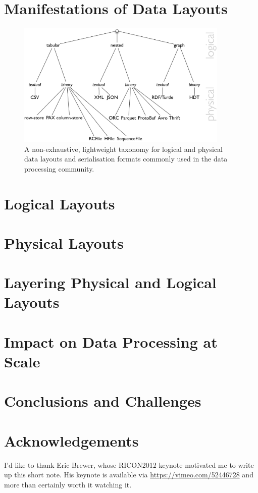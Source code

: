 \documentclass{llncs}
\begin{document}
\section{Manifestations of Data Layouts}
\label{sec:mani}




\begin{figure}[h!]
\centering
\includegraphics[width=0.9\textwidth]{taxonomy-dl}
\caption{A non-exhaustive, lightweight taxonomy for logical and physical data 
layouts and serialisation formats commonly used in the data processing 
community.}
\label{fig:taxonomy-dl}
\end{figure}

\section{Logical Layouts}
\label{sec:loglay}

\section{Physical Layouts}
\label{sec:phylay}

\section{Layering Physical and Logical Layouts}
\label{sec:laylay}


\section{Impact on Data Processing at Scale}
\label{sec:ldp}


\section{Conclusions and Challenges}
\label{sec:concl}

\section{Acknowledgements}
\label{sec:ack}
I'd like to thank Eric Brewer, whose RICON2012 keynote motivated me to write up
this short note. His keynote is available via \url{https://vimeo.com/52446728} 
and more than certainly worth it watching it.



\end{document}
